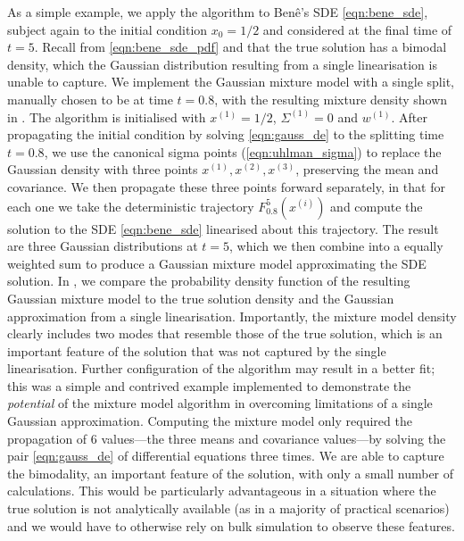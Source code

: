 As a simple example, we apply the algorithm to Ben\^e's SDE \cref{eqn:bene_sde}, subject again to the initial condition \(x_0 = 1/2\) and considered at the final time of \(t = 5\).
Recall from \cref{eqn:bene_sde_pdf} and  that the true solution has a bimodal density, which the Gaussian distribution resulting from a single linearisation is unable to capture.
We implement the Gaussian mixture model with a single split, manually chosen to be at time \(t = 0.8\), with the resulting mixture density shown in .
The algorithm is initialised with \(x^{(1)} = 1/2\), \(\Sigma^{(1)} = 0\) and \(w^{(1)}\).
After propagating the initial condition by solving \cref{eqn:gauss_de} to the splitting time \(t = 0.8\), we use the canonical sigma points (\cref{eqn:uhlman_sigma}) to replace the Gaussian density with three points \(x^{(1)}, x^{(2)}, x^{(3)}\), preserving the mean and covariance.
We then propagate these three points forward separately, in that for each one we take the deterministic trajectory \(F_{0.8}^{5}\!\left(x^{(i)}\right)\) and compute the solution to the SDE \cref{eqn:bene_sde} linearised about this trajectory.
The result are three Gaussian distributions at \(t = 5\), which we then combine into a equally weighted sum to produce a Gaussian mixture model approximating the SDE solution.
In , we compare the probability density function of the resulting Gaussian mixture model to the true solution density and the Gaussian approximation from a single linearisation.
Importantly, the mixture model density clearly includes two modes that resemble those of the true solution, which is an important feature of the solution that was not captured by the single linearisation.
Further configuration of the algorithm may result in a better fit; this was a simple and contrived example implemented to demonstrate the \emph{potential} of the mixture model algorithm in overcoming limitations of a single Gaussian approximation.
Computing the mixture model only required the propagation of 6 values---the three means and covariance values---by solving the pair \cref{eqn:gauss_de} of differential equations three times.
We are able to capture the bimodality, an important feature of the solution, with only a small number of calculations.
This would be particularly advantageous in a situation where the true solution is not analytically available (as in a majority of practical scenarios) and we would have to otherwise rely on bulk simulation to observe these features.



